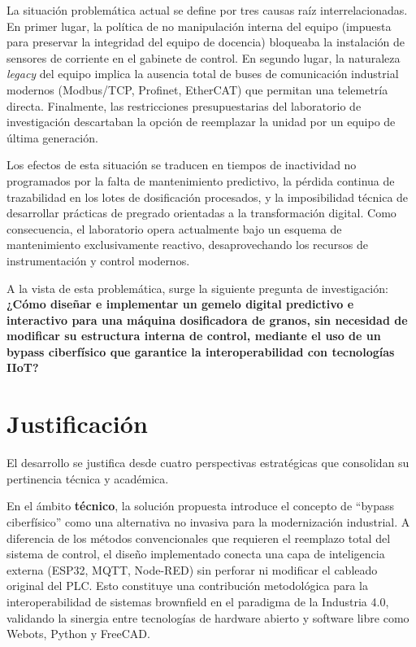 La situación problemática actual se define por tres causas raíz interrelacionadas. En primer lugar, la política de no manipulación interna del equipo (impuesta para preservar la integridad del equipo de docencia) bloqueaba la instalación de sensores de corriente en el gabinete de control. En segundo lugar, la naturaleza \textit{legacy} del equipo implica la ausencia total de buses de comunicación industrial modernos (Modbus/TCP, Profinet, EtherCAT) que permitan una telemetría directa. Finalmente, las restricciones presupuestarias del laboratorio de investigación descartaban la opción de reemplazar la unidad por un equipo de última generación.

Los efectos de esta situación se traducen en tiempos de inactividad no programados por la falta de mantenimiento predictivo, la pérdida continua de trazabilidad en los lotes de dosificación procesados, y la imposibilidad técnica de desarrollar prácticas de pregrado orientadas a la transformación digital. Como consecuencia, el laboratorio opera actualmente bajo un esquema de mantenimiento exclusivamente reactivo, desaprovechando los recursos de instrumentación y control modernos.

A la vista de esta problemática, surge la siguiente pregunta de investigación: \textbf{¿Cómo diseñar e implementar un gemelo digital predictivo e interactivo para una máquina dosificadora de granos, sin necesidad de modificar su estructura interna de control, mediante el uso de un bypass ciberfísico que garantice la interoperabilidad con tecnologías IIoT?}

\section{Justificación}
El desarrollo se justifica desde cuatro perspectivas estratégicas que consolidan su pertinencia técnica y académica.

En el ámbito \textbf{técnico}, la solución propuesta introduce el concepto de ``bypass ciberfísico'' como una alternativa no invasiva para la modernización industrial. A diferencia de los métodos convencionales que requieren el reemplazo total del sistema de control, el diseño implementado conecta una capa de inteligencia externa (ESP32, MQTT, Node-RED) sin perforar ni modificar el cableado original del PLC. Esto constituye una contribución metodológica para la interoperabilidad de sistemas brownfield en el paradigma de la Industria 4.0, validando la sinergia entre tecnologías de hardware abierto y software libre como Webots, Python y FreeCAD.

